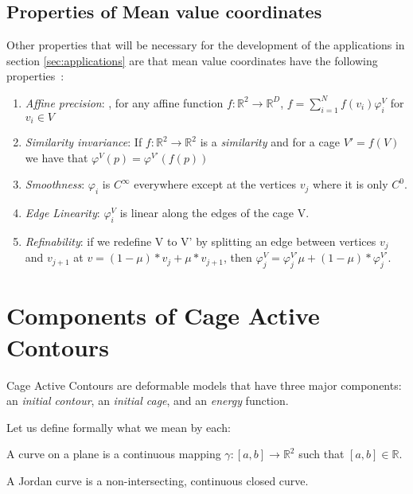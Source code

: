\subsection{Properties of Mean value coordinates}
\label{subsubsec:properties_mvc}
Other properties that will be necessary for the development of the applications in section \ref{sec:applications} are that mean value coordinates have the following properties~\cite{Hormann2006}:

\begin{enumerate}[label=\textbf{C.\arabic*}]
	\item \label{property:mvc1} \textit{Affine precision}: , for any affine function $f:\mathbb{R}^2\to \mathbb{R}^D$, $f=\sum\limits_{i=1}^{N}f(v_i)\varphi_i^V $ for $v_i\in V$
	\item \label{property:mvc2} \textit{Similarity invariance}: If $f:\mathbb{R}^2\to \mathbb{R}^2$ is a \textit{similarity} and for a cage $V'=f(V)$ we have that $\varphi^V(p)=\varphi^{V'}(f(p))$
	\item \label{property:mvc3} \textit{Smoothness}: $\varphi_i$ is $C^{\infty}$ everywhere except at the vertices $v_j$ where it is only $C^0$.
	\item \label{property:mvc4} \textit{Edge Linearity}: $\varphi_i^V$ is linear along the edges of the cage V.
	\item \label{property:mvc5} \textit{Refinability}: if we redefine V to V' by splitting an edge between vertices $v_{j}$ and $v_{j+1}$ at $v=(1-\mu)*v_j+ \mu*v_{j+1}$, then $\varphi_{j}^V=\varphi_{j}^{V'}	\mu + (1-\mu)*\varphi_{j}^{V'}$.
\end{enumerate}

	
\section{Components of Cage Active Contours}
\label{subsec:components_cac}
\noindent  Cage Active Contours are deformable models that have three major components: an \textit{initial contour}, an \textit{initial cage}, and an \textit{energy} function. 

Let us define formally what we mean by each:
\begin{definition}
	A curve on a plane is a continuous mapping $\gamma:[a,b]\to \mathbb{R}^2$ such that $[a,b]\in \mathbb{R}$. 
\end{definition}

\begin{definition}
	A Jordan curve is a non-intersecting, continuous closed curve.
\end{definition}


